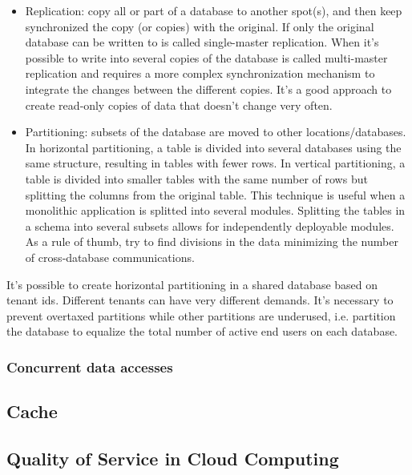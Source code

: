 \documentclass[11pt,english]{article} %
\begin{document}
\begin{itemize}
    \item Replication: copy all or part of a database to another spot(s), and then keep synchronized the copy (or copies) with the original. 
    If only the original database can be written to is called single-master replication. When it's possible to write into several copies of the database is called multi-master replication and requires a more complex synchronization mechanism to integrate the changes between the different copies.
    It's a good approach to create read‐only copies of data that doesn't change very often.
    \item Partitioning: subsets of the database are moved to other locations/databases.
    In horizontal partitioning, a table is divided into several databases using the same structure, resulting in tables with fewer rows.
    In vertical partitioning, a table is divided into smaller tables with the same number of rows but splitting the columns from the original table.
    This technique is useful when a monolithic application is splitted into several modules. Splitting the tables in a schema into several subsets allows for independently deployable modules.
    As a rule of thumb, try to find divisions in the data minimizing the number of cross‐database communications.
\end{itemize}

It's possible to create horizontal partitioning in a shared database based on tenant ids.
Different tenants can have very different demands.
It's necessary to prevent overtaxed partitions while other partitions are underused, i.e. partition the database to equalize the total number of active end users on each database.


\subsubsection{Concurrent data accesses}


\subsection{Cache}
\subsection{Quality of Service in Cloud Computing}
\end{document}
